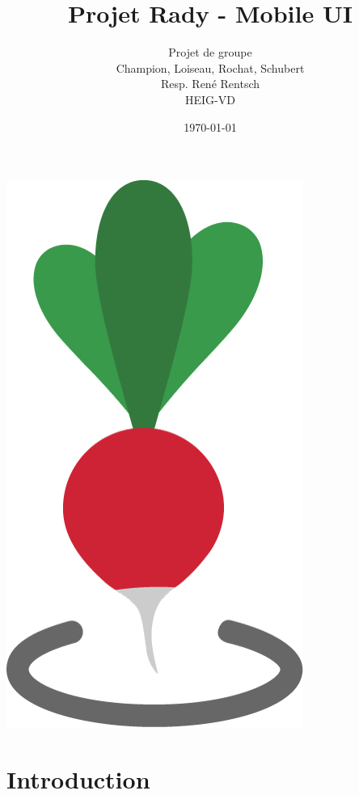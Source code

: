 \documentclass[french]{article}
\begin{document}
	
	\title{Projet Rady - Mobile UI}
	\author{Projet de groupe\\
		Champion, Loiseau, Rochat, Schubert\\
		Resp. René Rentsch\\
		HEIG-VD}
	\date{\today}
	\maketitle
	\vspace{5cm}
	\centering
	\includegraphics[scale=0.3]{../logo/icone}
	\thispagestyle{empty}
	\newpage
	
	\tableofcontents
	\newpage
	
	\justify
	
	\section{Introduction}
		 
\end{document}
